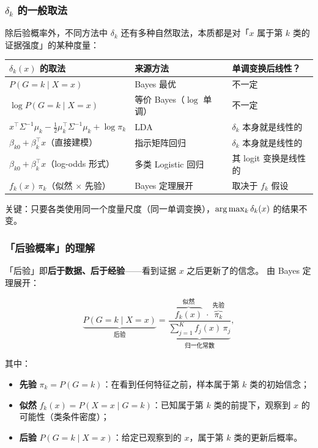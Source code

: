 \subsubsection{$\delta_k$ 的一般取法}

除后验概率外，不同方法中 $\delta_k$ 还有多种自然取法，本质都是对「$x$ 属于第 $k$ 类的证据强度」的某种度量：

\begin{center}
\begin{tabular}{lll}
\toprule
$\delta_k(x)$ 的取法 & 来源方法 & 单调变换后线性？ \\
\midrule
$P(G=k \mid X=x)$ & Bayes 最优 & 不一定 \\
$\log P(G=k \mid X=x)$ & 等价 Bayes（$\log$ 单调） & 不一定 \\
$x^\top\Sigma^{-1}\mu_k - \frac12\mu_k^\top\Sigma^{-1}\mu_k + \log\pi_k$ & LDA & $\delta_k$ 本身就是线性的 \\
$\beta_{k0} + \beta_k^\top x$（直接建模） & 指示矩阵回归 & $\delta_k$ 本身就是线性的 \\
$\beta_{k0} + \beta_k^\top x$（log-odds 形式） & 多类 Logistic 回归 & 其 logit 变换是线性的 \\
$f_k(x)\,\pi_k$（似然 $\times$ 先验） & Bayes 定理展开 & 取决于 $f_k$ 假设 \\
\bottomrule
\end{tabular}
\end{center}

关键：只要各类使用同一个度量尺度（同一单调变换），$\arg\max_k \delta_k(x)$ 的结果不变。

\subsubsection{「后验概率」的理解}

「后验」即\textbf{后于数据、后于经验}——看到证据 $x$ 之后更新了的信念。
由 Bayes 定理展开：

\[
\underbrace{P(G=k \mid X=x)}_{\text{后验}}
= \frac{\overbrace{f_k(x)}^{\text{似然}} \;\cdot\; \overbrace{\pi_k}^{\text{先验}}}
{\underbrace{\sum_{j=1}^{K} f_j(x)\,\pi_j}_{\text{归一化常数}}},
\]

其中：
\begin{itemize}
    \item \textbf{先验} $\pi_k = P(G=k)$：在看到任何特征之前，样本属于第 $k$ 类的初始信念；
    \item \textbf{似然} $f_k(x) = P(X=x \mid G=k)$：已知属于第 $k$ 类的前提下，观察到 $x$ 的可能性（类条件密度）；
    \item \textbf{后验} $P(G=k \mid X=x)$：给定已观察到的 $x$，属于第 $k$ 类的更新后概率。
\end{itemize}

